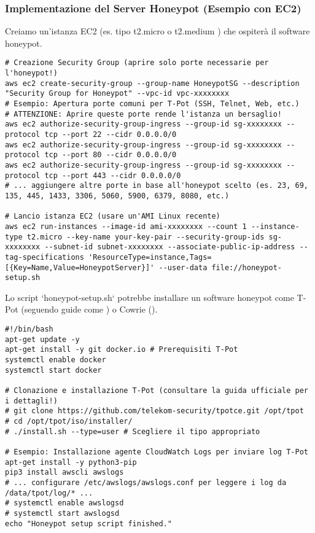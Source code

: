 \subsubsection{Implementazione del Server Honeypot (Esempio con EC2)}
\label{subsubsec:impl_server}

Creiamo un'istanza EC2 (es. tipo t2.micro o t2.medium \cite{aws_t2}) che ospiterà il software honeypot.

\begin{lstlisting}[caption={Configurazione (esemplificativa) del server honeypot EC2}, label=lst:ec2_setup]
# Creazione Security Group (aprire solo porte necessarie per l'honeypot!)
aws ec2 create-security-group --group-name HoneypotSG --description "Security Group for Honeypot" --vpc-id vpc-xxxxxxxx
# Esempio: Apertura porte comuni per T-Pot (SSH, Telnet, Web, etc.)
# ATTENZIONE: Aprire queste porte rende l'istanza un bersaglio!
aws ec2 authorize-security-group-ingress --group-id sg-xxxxxxxx --protocol tcp --port 22 --cidr 0.0.0.0/0
aws ec2 authorize-security-group-ingress --group-id sg-xxxxxxxx --protocol tcp --port 80 --cidr 0.0.0.0/0
aws ec2 authorize-security-group-ingress --group-id sg-xxxxxxxx --protocol tcp --port 443 --cidr 0.0.0.0/0
# ... aggiungere altre porte in base all'honeypot scelto (es. 23, 69, 135, 445, 1433, 3306, 5060, 5900, 6379, 8080, etc.)

# Lancio istanza EC2 (usare un'AMI Linux recente)
aws ec2 run-instances --image-id ami-xxxxxxxx --count 1 --instance-type t2.micro --key-name your-key-pair --security-group-ids sg-xxxxxxxx --subnet-id subnet-xxxxxxxx --associate-public-ip-address --tag-specifications 'ResourceType=instance,Tags=[{Key=Name,Value=HoneypotServer}]' --user-data file://honeypot-setup.sh
\end{lstlisting}

Lo script `honeypot-setup.sh` potrebbe installare un software honeypot come T-Pot (seguendo guide come \cite{zhang_2023}) o Cowrie (\cite{cowrie_aws, infosanity_2020}).

\begin{lstlisting}[caption={Script di esempio `honeypot-setup.sh` per installare T-Pot (semplificato)}, label=lst:tpot_setup]
#!/bin/bash
apt-get update -y
apt-get install -y git docker.io # Prerequisiti T-Pot
systemctl enable docker
systemctl start docker

# Clonazione e installazione T-Pot (consultare la guida ufficiale per i dettagli!)
# git clone https://github.com/telekom-security/tpotce.git /opt/tpot
# cd /opt/tpot/iso/installer/
# ./install.sh --type=user # Scegliere il tipo appropriato

# Esempio: Installazione agente CloudWatch Logs per inviare log T-Pot
apt-get install -y python3-pip
pip3 install awscli awslogs
# ... configurare /etc/awslogs/awslogs.conf per leggere i log da /data/tpot/log/* ...
# systemctl enable awslogsd
# systemctl start awslogsd
echo "Honeypot setup script finished."
\end{lstlisting}

